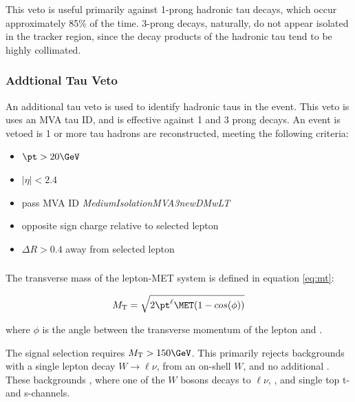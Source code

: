 This veto is useful primarily against 1-prong hadronic tau decays, which occur approximately 85\% of the time.  3-prong decays, naturally, do not appear isolated in the tracker region, since the decay products of the hadronic tau tend to be highly collimated.  

\subsubsection{Addtional Tau Veto}
\label{sec:obj_sel:tau_veto}

An additional tau veto is used to identify hadronic taus in the event.  This veto is uses an MVA tau ID, and is effective against 1 and 3 prong decays.  An event is vetoed is 1 or more tau hadrons are reconstructed, meeting the following criteria:

\begin{itemize}
  \item $\pt>20\GeV$
  \item $|\eta|<2.4$
  \item pass MVA ID \textit{MediumIsolationMVA3newDMwLT}
  \item opposite sign charge relative to selected lepton
  \item ${\Delta}R>0.4$ away from selected lepton
\end{itemize}


\subsubsection{ \MT }
\label{sec:obj_sel:mt}

The transverse mass of the lepton-MET system is defined in equation \ref{eq:mt}:

\begin{equation}\label{eq:mt}
\MT = \sqrt{2 \pt^{\ell} \MET (1 - cos(\phi))}
\end{equation}

where $\phi$ is the angle between the transverse momentum of the lepton and \MET.  

The signal selection requires $\MT > 150\GeV$.  This primarily rejects backgrounds with a single lepton decay $W\rightarrow \ell\nu$, from an on-shell $W$, and no additional \MET.  These backgrounds \ttbar, where one of the $W$ bosons decays to $\ell\nu$, \wjets, and single top t- and s-channels.  


\subsubsection{ \minDPhiMETjet }
\label{sec:obj_sel:minDPhi}

